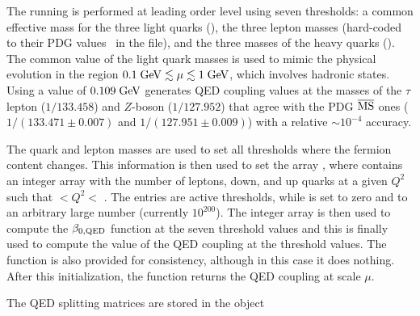 The running is performed at leading order level using seven
thresholds: a common effective mass for the three light quarks
(), the three lepton masses (hard-coded to their
PDG values~\cite{ParticleDataGroup:2022pth} in the
 file), and the three masses of the heavy
quarks ().
%
The common value of the light quark masses is used to mimic the
physical evolution in the region $0.1\;\mathrm{GeV} \lesssim \mu \lesssim
1\;\mathrm{GeV}$, which involves hadronic states.
%
Using a value of $0.109\;\mathrm{GeV}$ generates QED coupling values at
the masses of the $\tau$ lepton ($1/133.458$) and $Z$-boson ($1/127.952$) that
agree with the PDG $\overline{\mathrm{MS}}$  ones ($1/(133.471\pm0.007)$ and $1/(127.951\pm0.009)$)
with a relative $\sim 10^{-4}$ accuracy.
% 
%

The quark and lepton masses are used to set all thresholds where the
fermion content changes. This information is then used to set
the array , where 
contains an integer array with the number of leptons, down, and up
quarks at a given $Q^2$ such that $<Q^2<$
.
%
The  entries are active thresholds, while
 is set to zero and  to an
arbitrary large number (currently $10^{200}$).
%
The integer array
 is then used to compute the
$\beta_{0,\rm QED}$ function  at the
seven threshold values and this is finally used to compute the value
of the QED coupling  at the
threshold values.
%
The function  is also provided for
consistency, although in this case it does nothing.
%
After this initialization, the function  returns the QED coupling at
scale $\mu$.


The QED splitting matrices are stored in the object

